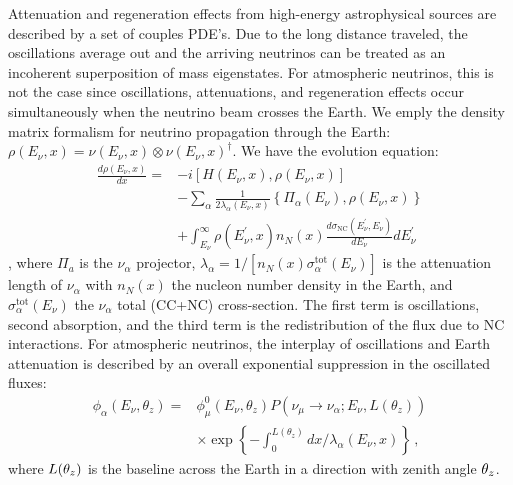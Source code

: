 \documentclass[twocolumn]{article}
\newcommand{\na}{\ensuremath{\nu_\alpha}}
\renewcommand{\a}{\ensuremath{\alpha}}
\renewcommand{\th}[1][]{%
  \theta\ifx\\#1\\\else_\text{#1}\fi
}
\renewcommand{\t}[1]{\ensuremath{\text{{#1}}}}
\begin{document}
Attenuation and regeneration effects from high-energy astrophysical sources are described by a set of couples PDE's. Due to the long distance traveled, the oscillations average out and the arriving neutrinos can be treated as an incoherent superposition of mass eigenstates. For atmospheric neutrinos, this is not the case since oscillations, attenuations, and regeneration effects occur simultaneously when the neutrino beam crosses the Earth. We emply the density matrix formalism for neutrino propagation through the Earth: $\rho\left(E_{\nu}, x\right)=\nu\left(E_{\nu}, x\right) \otimes \nu\left(E_{\nu}, x\right)^{\dagger}$. We have the evolution equation:
\begin{align*}
\frac{d \rho\left(E_{\nu}, x\right)}{d x}=&-i\left[H\left(E_{\nu}, x\right), \rho\left(E_{\nu}, x\right)\right] \\
&-\sum_{\alpha} \frac{1}{2 \lambda_{\alpha}\left(E_{\nu}, x\right)}\left\{\Pi_{\alpha}\left(E_{\nu}\right), \rho\left(E_{\nu}, x\right)\right\} \\
&+\int_{E_{\nu}}^{\infty} \rho\left(E_{\nu}^{\prime}, x\right) n_{N}(x) \frac{d \sigma_{\mathrm{NC}}\left(E_{\nu}^{\prime}, E_{\nu}\right)}{d E_{\nu}} d E_{\nu}^{\prime}
\end{align*},
where $\Pi_a$ is the $\na$ projector, $\lambda_\a = 1/[n_N(x) \sigma^\t{tot}_\a(E_\nu)]$ is the attenuation length of $\na$ with $n_N(x)$ the nucleon number density in the Earth, and $\sigma^\t{tot}_\alpha(E_\nu)$ the $\na$ total (CC+NC) cross-section. The first term is oscillations, second absorption, and the third term is the redistribution of the flux due to NC interactions. 
For atmospheric neutrinos, the interplay of oscillations and Earth attenuation is described by an overall exponential suppression in the oscillated fluxes:
\begin{align*}
\phi_{\alpha}\left(E_{\nu}, \theta_{z}\right)=& \phi_{\mu}^{0}\left(E_{\nu}, \theta_{z}\right) P\left(\nu_{\mu} \rightarrow \nu_{\alpha} ; E_{\nu}, L\left(\theta_{z}\right)\right) \\
& \times \exp \left\{-\int_{0}^{L\left(\theta_{z}\right)} d x / \lambda_{\alpha}\left(E_{\nu}, x\right)\right\}
\,,\end{align*}
where $L(\th_z)$ is the baseline across the Earth in a direction with zenith angle $\th_z$.
\end{document}
